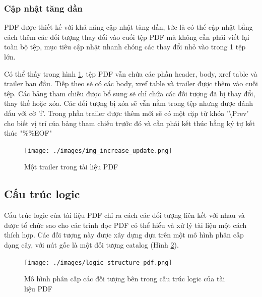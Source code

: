 \documentclass[./../main.tex]{subfiles}
\begin{document}
\subsubsection*{Cập nhật tăng dần}
PDF được thiết kế với khả năng cập nhật tăng dần, tức là có thể cập nhật bằng cách thêm các đối tượng thay đổi vào cuối tệp PDF mà không cần phải viết lại toàn bộ tệp, mục tiêu cập nhật nhanh chóng các thay đổi nhỏ vào trong 1 tệp lớn.

Có thể thấy trong hình \ref{fig:update}, tệp PDF vẫn chứa các phần header, body, xref table và trailer ban đầu. Tiếp theo sẽ có các body, xref table và trailer được thêm vào cuối tệp. Các bảng tham chiếu được bổ sung sẽ chỉ chứa các đối tượng đã bị thay đổi, thay thế  hoặc xóa. Các đối tượng bị xóa sẽ vẫn nằm trong tệp nhưng được đánh dấu với cờ 'f'.  Trong phần trailer được thêm mới sẽ có một cặp từ khóa '\textbackslash Prev' cho biết vị trí của bảng tham chiếu trước đó và cần phải kết thúc bằng ký tự kết thúc "\%\%EOF"
\begin{figure}[ht!]
	\centering
	\texttt{[image: ./images/img\_increase\_update.png]}
	\caption{Một trailer trong tài liệu PDF}
	\label{fig:update}
\end{figure}



\subsection{Cấu trúc logic}

Cấu trúc logic của tài liệu PDF chỉ ra cách các đối tượng liên kết với nhau và được tổ chức sao cho các trình đọc PDF có thể hiểu và xử lý tài liệu một cách thích hợp. Các đối tượng này được xây dựng dựa trên một mô hình phân cấp dạng cây, với nút gốc là một đối tượng catalog (Hình \ref{fig:logic_structure}).

\begin{figure}[ht!]
	\centering
	\texttt{[image: ./images/logic\_structure\_pdf.png]}
	\caption{Mô hình phân cấp các đối tượng bên trong cấu trúc logic của tài liệu PDF}
	\label{fig:logic_structure}
\end{figure}
\end{document}
